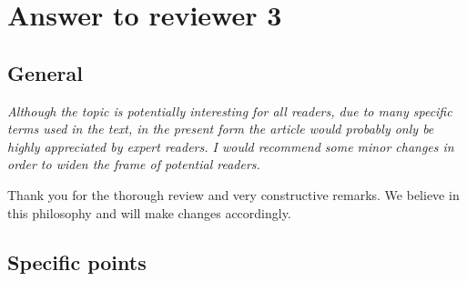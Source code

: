 \documentclass[11pt]{article} %
\newcommand\1{\vec 1}
\newcommand\q[1]{\textit{#1}}
\newcommand\ans[1]{#1}
\begin{document}
\section{Answer to reviewer 3}

\subsection*{General}

\q{Although the topic is potentially interesting for all readers, due to many specific terms used in the text, in the present form the article would probably only be highly appreciated by expert readers. I would recommend some minor changes in order to widen the frame of potential readers.}

\ans{Thank you for the thorough review and very constructive remarks. We believe in this philosophy and will make changes accordingly.}

\subsection*{Specific points}
\end{document}

